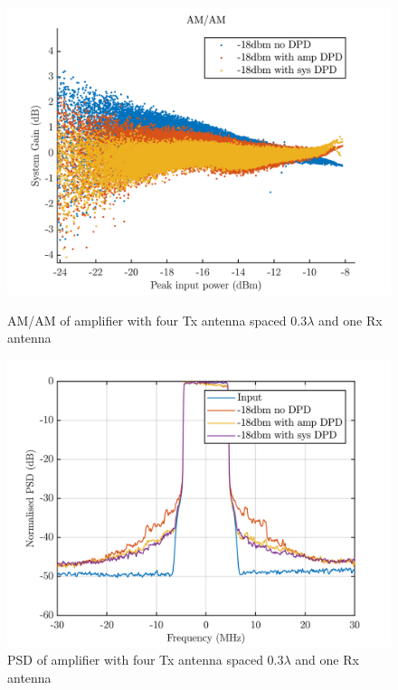 \begin{figure}[H]
  \centering
  \begin{minipage}[b]{0.5\textwidth}
	\includegraphics[scale = 0.5]{figures/measurement/cree/four/amam_four_ant_0p3.png}
	\caption{AM/AM of amplifier with four Tx antenna spaced $0.3\lambda$ and one Rx antenna}
    \label{fig:cree_amam_four_ant2}
  \end{minipage}
  \hfill
  \begin{minipage}[b]{0.4\textwidth}
\includegraphics[scale = 0.5]{figures/measurement/cree/four/psd_four_ant_0p3.png}
\caption{PSD of amplifier with four Tx antenna spaced $0.3\lambda$ and one Rx antenna}
    \label{fig:cree_psd_four_ant2}
  \end{minipage}
\end{figure}

